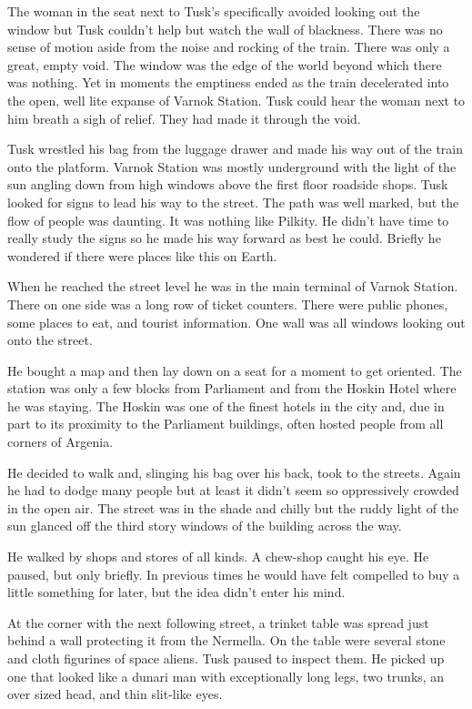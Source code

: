 The woman in the seat next to Tusk's specifically avoided looking out the window but Tusk
couldn't help but watch the wall of blackness. There was no sense of motion aside from the noise
and rocking of the train. There was only a great, empty void. The window was the edge of the
world beyond which there was nothing. Yet in moments the emptiness ended as the train
decelerated into the open, well lite expanse of Varnok Station. Tusk could hear the woman next
to him breath a sigh of relief. They had made it through the void.

Tusk wrestled his bag from the luggage drawer and made his way out of the train onto the
platform. Varnok Station was mostly underground with the light of the sun angling down from high
windows above the first floor roadside shops. Tusk looked for signs to lead his way to the
street. The path was well marked, but the flow of people was daunting. It was nothing like
Pilkity. He didn't have time to really study the signs so he made his way forward as best he
could. Briefly he wondered if there were places like this on Earth.

When he reached the street level he was in the main terminal of Varnok Station. There on one
side was a long row of ticket counters. There were public phones, some places to eat, and
tourist information. One wall was all windows looking out onto the street.

He bought a map and then lay down on a seat for a moment to get oriented. The station was only a
few blocks from Parliament and from the Hoskin Hotel where he was staying. The Hoskin was one of
the finest hotels in the city and, due in part to its proximity to the Parliament buildings,
often hosted people from all corners of Argenia.

He decided to walk and, slinging his bag over his back, took to the streets. Again he had to
dodge many people but at least it didn't seem so oppressively crowded in the open air. The
street was in the shade and chilly but the ruddy light of the sun glanced off the third story
windows of the building across the way.

He walked by shops and stores of all kinds. A chew-shop caught his eye. He paused, but only
briefly. In previous times he would have felt compelled to buy a little something for later, but
the idea didn't enter his mind.

At the corner with the next following street, a trinket table was spread just behind a wall
protecting it from the Nermella. On the table were several stone and cloth figurines of space
aliens. Tusk paused to inspect them. He picked up one that looked like a dunari man with
exceptionally long legs, two trunks, an over sized head, and thin slit-like eyes.

